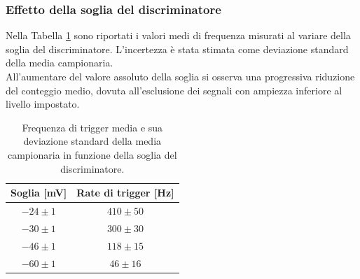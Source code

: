 \documentclass[10pt,a4paper]{article}
\begin{document}
\subsubsection{Effetto della soglia del discriminatore}
Nella Tabella \ref{tab:effetto_soglia} sono riportati i valori medi di frequenza misurati al variare della soglia del discriminatore. L'incertezza è stata stimata come deviazione standard della media campionaria.\\All'aumentare del valore assoluto della soglia si osserva una progressiva riduzione del conteggio medio, dovuta all'esclusione dei segnali con ampiezza inferiore al livello impostato.
\begin{table}[h!]
  \centering

  
  \vspace{0.2cm}
  \begin{tabular}{||c|c||}
    \hline
    \textbf{Soglia [mV]} & \textbf{Rate di trigger [Hz]} \\
    \hline
    $-24 \pm 1$ & $410 \pm 50$ \\ \hline
    $-30 \pm 1$ & $300 \pm 30$ \\ \hline
    $-46 \pm 1$ & $118 \pm 15$ \\ \hline
    $-60 \pm 1$ & $46 \pm 16$ \\
    \hline
  \end{tabular}
    \caption{Frequenza di trigger media e sua deviazione standard della media campionaria in funzione della soglia del discriminatore.}
    \label{tab:effetto_soglia}
\end{table}




\end{document}

